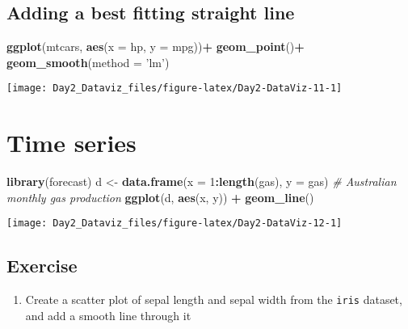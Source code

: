 \documentclass[12pt,letterpaperpaper,openany]{book}
\newenvironment{Shaded}{\begin{snugshade}}{\end{snugshade}}
\newcommand{\CommentTok}[1]{\textcolor[rgb]{0.56,0.35,0.01}{\textit{#1}}}
\newcommand{\DataTypeTok}[1]{\textcolor[rgb]{0.13,0.29,0.53}{#1}}
\newcommand{\DecValTok}[1]{\textcolor[rgb]{0.00,0.00,0.81}{#1}}
\newcommand{\KeywordTok}[1]{\textcolor[rgb]{0.13,0.29,0.53}{\textbf{#1}}}
\newcommand{\NormalTok}[1]{#1}
\newcommand{\OperatorTok}[1]{\textcolor[rgb]{0.81,0.36,0.00}{\textbf{#1}}}
\newcommand{\StringTok}[1]{\textcolor[rgb]{0.31,0.60,0.02}{#1}}
\providecommand{\tightlist}{%
  \setlength{\itemsep}{0pt}\setlength{\parskip}{0pt}}
\begin{document}
\hypertarget{adding-a-best-fitting-straight-line}{%
\subsection{Adding a best fitting straight line}\label{adding-a-best-fitting-straight-line}}

\begin{Shaded}
\begin{Highlighting}[]
\KeywordTok{ggplot}\NormalTok{(mtcars, }\KeywordTok{aes}\NormalTok{(}\DataTypeTok{x =}\NormalTok{ hp, }\DataTypeTok{y =}\NormalTok{ mpg))}\OperatorTok{+}
\StringTok{  }\KeywordTok{geom_point}\NormalTok{()}\OperatorTok{+}
\StringTok{  }\KeywordTok{geom_smooth}\NormalTok{(}\DataTypeTok{method =} \StringTok{'lm'}\NormalTok{)}
\end{Highlighting}
\end{Shaded}

\texttt{[image: Day2\_Dataviz\_files/figure-latex/Day2-DataViz-11-1]}

\hypertarget{time-series}{%
\section{Time series}\label{time-series}}

\begin{Shaded}
\begin{Highlighting}[]
\KeywordTok{library}\NormalTok{(forecast)}
\NormalTok{d <-}\StringTok{ }\KeywordTok{data.frame}\NormalTok{(}\DataTypeTok{x =} \DecValTok{1}\OperatorTok{:}\KeywordTok{length}\NormalTok{(gas), }\DataTypeTok{y =}\NormalTok{ gas) }\CommentTok{# Australian monthly gas production}
\KeywordTok{ggplot}\NormalTok{(d, }\KeywordTok{aes}\NormalTok{(x, y)) }\OperatorTok{+}\StringTok{ }\KeywordTok{geom_line}\NormalTok{()}
\end{Highlighting}
\end{Shaded}

\texttt{[image: Day2\_Dataviz\_files/figure-latex/Day2-DataViz-12-1]}

\hypertarget{exercise-1}{%
\subsection{Exercise}\label{exercise-1}}

\begin{enumerate}
\def\labelenumi{\arabic{enumi}.}
\tightlist
\item
  Create a scatter plot of sepal length and sepal width from the \texttt{iris} dataset, and
  add a smooth line through it
\end{enumerate}
\end{document}
